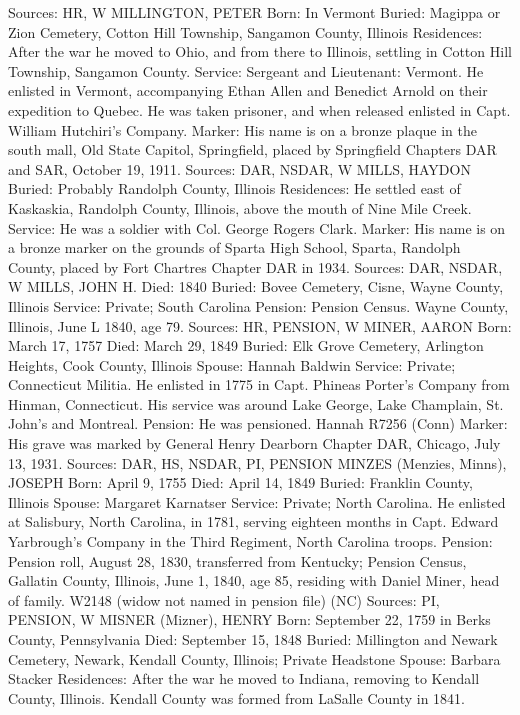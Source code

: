 Sources: HR, W 
MILLINGTON, PETER
Born: In Vermont
Buried: Magippa or Zion Cemetery, Cotton Hill Township, Sangamon County, Illinois 
Residences: After the war he moved to Ohio, and from there to Illinois, settling in Cotton Hill Township, Sangamon County. 
Service: Sergeant and Lieutenant: Vermont. He enlisted in Vermont, accompany­ing Ethan Allen and Benedict Arnold on their expedition to Quebec. He was taken prisoner, and when released enlisted in Capt. William Hutchiri's Com­pany. 
Marker: His name is on a bronze plaque in the south mall, Old State Capitol, Springfield, placed by Springfield Chapters DAR and SAR, October 19, 1911.
Sources: DAR, NSDAR, W 
MILLS, HAYDON 
Buried: Probably Randolph County, Illinois
Residences: He settled east of Kaskaskia, Randolph County, Illinois, above the mouth of Nine Mile Creek.
Service: He was a soldier with Col. George Rogers Clark. 
Marker: His name is on a bronze marker on the grounds of Sparta High School, Sparta, Randolph County, placed by Fort Chartres Chapter DAR in 1934.
Sources: DAR, NSDAR, W 
MILLS, JOHN H. 
Died: 1840
Buried: Bovee Cemetery, Cisne, Wayne County, Illinois
Service: Private; South Carolina 
Pension: Pension Census. Wayne County, Illinois, June L 1840, age 79. 
Sources: HR, PENSION, W 
MINER, AARON 
Born: March 17, 1757
Died: March 29, 1849
Buried: Elk Grove Cemetery, Arlington Heights, Cook County, Illinois
Spouse: Hannah Baldwin
Service: Private; Connecticut Militia. He enlisted in 1775 in Capt. Phineas Porter's Company from Hinman, Connecticut. His service was around Lake George, Lake Champlain, St. John's and Montreal.
Pension: He was pensioned. Hannah R7256 (Conn)
Marker: His grave was marked by General Henry Dearborn Chapter DAR, Chi­cago, July 13, 1931.
Sources: DAR, HS, NSDAR, PI, PENSION 
MINZES (Menzies, Minns), JOSEPH
Born: April 9, 1755
Died: April 14, 1849
Buried: Franklin County, Illinois
Spouse: Margaret Karnatser
Service: Private; North Carolina. He enlisted at Salisbury, North Carolina, in 1781, serving eighteen months in Capt. Edward Yarbrough's Company in the Third Regiment, North Carolina troops. 
Pension: Pension roll, August 28, 1830, transferred from Kentucky; Pension Cen­sus, Gallatin County, Illinois, June 1, 1840, age 85, residing with Daniel Miner, head of family. W2148 (widow not named in pension file) (NC) 
Sources: PI, PENSION, W 
MISNER (Mizner), HENRY
Born: September 22, 1759 in Berks County, Pennsylvania
Died: September 15, 1848
Buried: Millington and Newark Cemetery, Newark, Kendall County, Illinois; Private Headstone
Spouse: Barbara Stacker
Residences: After the war he moved to Indiana, removing to Kendall County, Illinois. Kendall County was formed from LaSalle County in 1841. 
